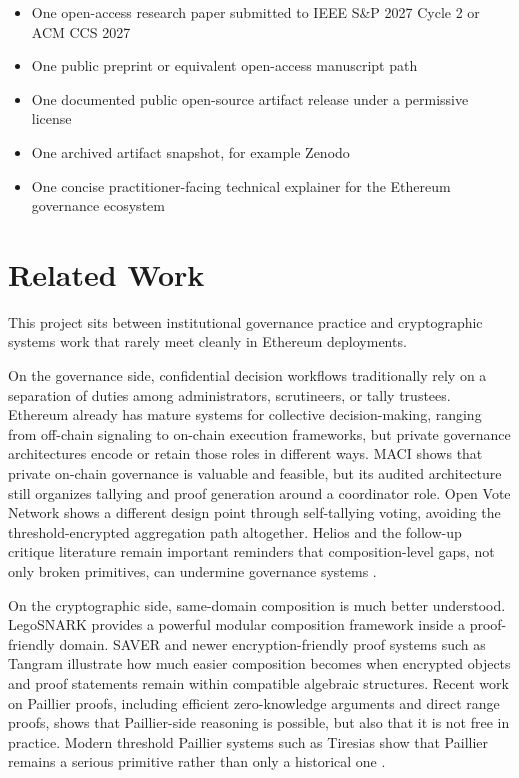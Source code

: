 \documentclass[11pt]{article}
\begin{document}
\begin{itemize}[leftmargin=*,nosep]
\item One open-access research paper submitted to IEEE S\&P 2027 Cycle 2 or ACM CCS 2027
\item One public preprint or equivalent open-access manuscript path
\item One documented public open-source artifact release under a permissive license
\item One archived artifact snapshot, for example Zenodo
\item One concise practitioner-facing technical explainer for the Ethereum
      governance ecosystem
\end{itemize}


\section{Related Work}

This project sits between institutional governance practice and cryptographic
systems work that rarely meet cleanly in Ethereum deployments.

On the governance side, confidential decision workflows traditionally rely on a
separation of duties among administrators, scrutineers, or tally trustees.
Ethereum already has mature systems for collective decision-making, ranging from
off-chain signaling to on-chain execution frameworks, but private governance
architectures encode or retain those roles in different ways. MACI shows that
private on-chain governance is valuable and feasible, but its audited
architecture still organizes tallying and proof generation around a coordinator
role. Open Vote Network shows a different design point through self-tallying
voting, avoiding the threshold-encrypted aggregation path altogether. Helios and
the follow-up critique literature remain important reminders that
composition-level gaps, not only broken primitives, can undermine governance
systems \cite{maci2024audit,mccorry2017,adida2008,cortier2013,bernhard2015}.

On the cryptographic side, same-domain composition is much better understood.
LegoSNARK provides a powerful modular composition framework inside a
proof-friendly domain. SAVER and newer encryption-friendly proof systems such as
Tangram illustrate how much easier composition becomes when encrypted objects
and proof statements remain within compatible algebraic structures. Recent work
on Paillier proofs, including efficient zero-knowledge arguments and direct
range proofs, shows that Paillier-side reasoning is possible, but also that it
is not free in practice. Modern threshold Paillier systems such as Tiresias
show that Paillier remains a serious primitive rather than only a historical
one \cite{legosnark2019,saver2019,tangram2025,gong2024,xie2024,tiresias2025}.
\end{document}
